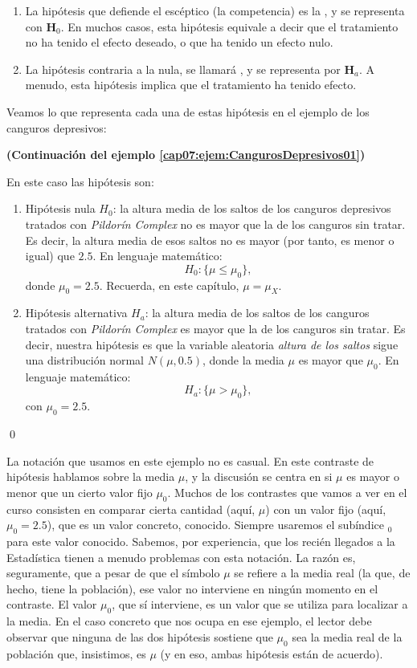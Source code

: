     \begin{enumerate}
    \item La hipótesis que defiende el escéptico (la competencia) es la , y se representa con $\mathbf  H_0$. En muchos casos, esta hipótesis equivale a decir que el tratamiento no ha tenido el efecto deseado, o que ha tenido un {\sf efecto nulo}.
    \item La hipótesis contraria a la nula, se llamará , y se representa por $\mathbf  H_a$. A menudo, esta hipótesis implica que el tratamiento ha tenido efecto.
    \end{enumerate}

Veamos lo que representa cada una de estas hipótesis en el ejemplo de los canguros depresivos:
\begin{ejemplo}
{\bf (Continuación del ejemplo \ref{cap07:ejem:CangurosDepresivos01})}
\label{cap07:ejem:CangurosDepresivos02}

    En este caso las hipótesis son:
    \begin{enumerate}
    \item {\sf Hipótesis nula $H_0$:} la altura media de los saltos de los canguros depresivos tratados con {\em Pildorín Complex} no es mayor que la de los canguros sin tratar. Es decir, la altura media de esos saltos no es mayor (por tanto, es menor o igual) que $2.5$. En lenguaje matemático:
        \[H_0: \{\mu\leq \mu_0\},\]
        donde $\mu_0=2.5$. Recuerda, en este capítulo, $\mu=\mu_X$.
    \item {\sf Hipótesis alternativa $H_a$:} la altura media de los saltos de los canguros tratados con {\em Pildorín Complex} es mayor que la de los canguros sin tratar. Es decir, nuestra hipótesis es que la variable aleatoria {\em altura de los saltos} sigue una distribución normal $N(\mu,0.5)$, donde {\sf la media $\mu$ es mayor que $\mu_0$}. En lenguaje matemático:
        \[H_a: \{\mu > \mu_0\},\]
        con $\mu_0=2.5$.
    \end{enumerate}
    \qed
\end{ejemplo}
La notación que usamos en este ejemplo no es casual. En este contraste de hipótesis hablamos sobre la media $\mu$, y la discusión se centra en si $\mu$ es mayor o menor que un cierto valor fijo $\mu_0$. Muchos de los contrastes que vamos a ver en el curso consisten en comparar cierta cantidad (aquí, $\mu$) con un valor fijo (aquí, $\mu_0=2.5$), que es un valor concreto, conocido. Siempre usaremos el subíndice $_0$ para este valor conocido. Sabemos, por experiencia, que los recién llegados a la Estadística tienen a menudo problemas con esta notación. La razón es, seguramente, que a pesar de que el símbolo $\mu$ se refiere a la media real (la que, de hecho, tiene la población), ese valor no interviene en ningún momento en el contraste. El valor $\mu_0$, que sí interviene, es un valor que se utiliza para localizar a la media. En el caso concreto que nos ocupa en ese ejemplo, el lector debe observar que ninguna de las dos hipótesis sostiene que $\mu_0$ sea la media real de la población que, insistimos, es $\mu$ (y en eso, ambas hipótesis están de acuerdo).

